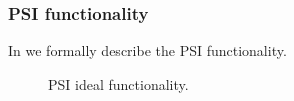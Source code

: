 \subsubsection{PSI functionality}
\label{sec:psifunc}
In  we formally describe the PSI functionality.%

\begin{figure}[htb]\centering
{}
\caption{PSI ideal functionality.}
\label{fig:psifunc}
\end{figure} 

